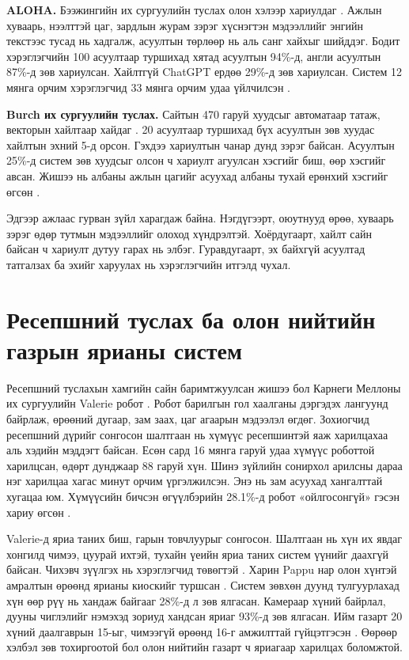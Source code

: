 \textbf{ALOHA.} Бээжингийн их сургуулийн туслах олон хэлээр хариулдаг \cite{tao2025aloha}. Ажлын хуваарь, нээлттэй цаг, зардлын журам зэрэг хүснэгтэн мэдээллийг энгийн текстээс тусад нь хадгалж, асуултын төрлөөр нь аль санг хайхыг шийддэг. Бодит хэрэглэгчийн 100 асуултаар туршихад хятад асуултын 94\%-д, англи асуултын 87\%-д зөв хариулсан. Хайлтгүй ChatGPT ердөө 29\%-д зөв хариулсан. Систем 12 мянга орчим хэрэглэгчид 33 мянга орчим удаа үйлчилсэн \cite{tao2025aloha}.

\textbf{Burch их сургуулийн туслах.} Сайтын 470 гаруй хуудсыг автоматаар татаж, векторын хайлтаар хайдаг \cite{matic2026burch}. 20 асуултаар туршихад бүх асуултын зөв хуудас хайлтын эхний 5-д орсон. Гэхдээ хариултын чанар дунд зэрэг байсан. Асуултын 25\%-д систем зөв хуудсыг олсон ч хариулт агуулсан хэсгийг биш, өөр хэсгийг авсан. Жишээ нь албаны ажлын цагийг асуухад албаны тухай ерөнхий хэсгийг өгсөн \cite{matic2026burch}.

Эдгээр ажлаас гурван зүйл харагдаж байна. Нэгдүгээрт, оюутнууд өрөө, хуваарь зэрэг өдөр тутмын мэдээллийг олоход хүндрэлтэй. Хоёрдугаарт, хайлт сайн байсан ч хариулт дутуу гарах нь элбэг. Гуравдугаарт, эх байхгүй асуултад татгалзах ба эхийг харуулах нь хэрэглэгчийн итгэлд чухал.

\section{Ресепшний туслах ба олон нийтийн газрын ярианы систем}
\label{sec:lit-reception}

Ресепшний туслахын хамгийн сайн баримтжуулсан жишээ бол Карнеги Меллоны их сургуулийн Valerie робот \cite{gockley2005valerie}. Робот барилгын гол хаалганы дэргэдэх лангуунд байрлаж, өрөөний дугаар, зам заах, цаг агаарын мэдээлэл өгдөг. Зохиогчид ресепшний дүрийг сонгосон шалтгаан нь хүмүүс ресепшинтэй яаж харилцахаа аль хэдийн мэддэгт байсан. Есөн сард 16 мянга гаруй удаа хүмүүс роботтой харилцсан, өдөрт дунджаар 88 гаруй хүн. Шинэ зүйлийн сонирхол арилсны дараа нэг харилцаа хагас минут орчим үргэлжилсэн. Энэ нь зам асуухад хангалттай хугацаа юм. Хүмүүсийн бичсэн өгүүлбэрийн 28.1\%-д робот «ойлгосонгүй» гэсэн хариу өгсөн \cite{gockley2005valerie}.

Valerie-д яриа таних биш, гарын товчлуурыг сонгосон. Шалтгаан нь хүн их явдаг хонгилд чимээ, цуурай ихтэй, тухайн үеийн яриа таних систем үүнийг даахгүй байсан. Чихэвч зүүлгэх нь хэрэглэгчид төвөгтэй \cite{gockley2005valerie}. Харин Pappu нар олон хүнтэй амралтын өрөөнд ярианы киоскийг туршсан \cite{pappu2014public}. Систем зөвхөн дуунд тулгуурлахад хүн өөр рүү нь хандаж байгааг 28\%-д л зөв ялгасан. Камераар хүний байрлал, дууны чиглэлийг нэмэхэд зориуд хандсан яриаг 93\%-д зөв ялгасан. Ийм газарт 20 хүний даалгаврын 15-ыг, чимээгүй өрөөнд 16-г амжилттай гүйцэтгэсэн \cite{pappu2014public}. Өөрөөр хэлбэл зөв тохиргоотой бол олон нийтийн газарт ч яриагаар харилцах боломжтой.

